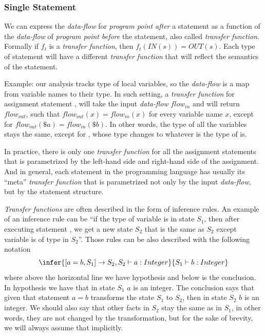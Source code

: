         \subsubsection*{Single Statement}
        
        We can express the \emph{data-flow} for \emph{program point after} 
        a statement as a function of the \emph{data-flow} of 
        \emph{program point before} the statement, also called \emph{transfer function}. 
        Formally if $f_t$ is a \emph{transfer function}, then $f_t(IN(s))=OUT(s)$.
        Each type of statement will have a different \emph{transfer function} 
        that will reflect the semantics of the statement. 
        
        Example: our analysis tracks type of local variables, so the \emph{data-flow} 
        is a map from variable names to their type. In such setting, a \emph{transfer function} 
        for assignment statement , will take the input \emph{data-flow} 
        $flow_{in}$ and will return $flow_{out}$, such that $flow_{out}(x)=flow_{in}(x)$ for 
        every variable name $x$, except for $flow_{out}(\$a)=flow_{in}(\$b)$. In other words, 
        the type of all the variables stays the same, except for , whose type 
        changes to whatever is the type of  is. 
        
        In practice, there is only one \emph{transfer function} for all the assignment 
        statements that is parametrized by the left-hand side and right-hand side of 
        the assignment. And in general, each statement in the programming language has 
        usually its ``meta'' \emph{transfer function} that is parametrized not only 
        by the input \emph{data-flow}, but by the statement structure.
        
        \emph{Transfer functions} are often described in the form of inference rules. 
        An example of an inference rule can be 
        ``if the type of variable  is  in state $S_1$, 
        then after executing statement , we get a new state $S_2$ that 
        is the same as $S_2$ except variable  is of type  in $S_2$''. 
        Those rules can be also described with the following notation        
        $$
        \infer{[a=b, S_1] \rightarrow S_2, S_2 \vdash a : Integer}{S_1 \vdash b : Integer}
        $$        
        where above the horizontal line we have hypothesis and below is 
        the conclusion. In hypothesis we have that in state $S_1$ $a$ 
        is an integer. The conclusion says that given that statement 
        $a=b$ transforms the state $S_1$ to $S_2$, then 
        in state $S_2$ $b$ is an integer. We should also say that other 
        facts in $S_2$ stay the same as in $S_1$, in other words, they 
        are not changed by the transformation, but for the sake 
        of brevity, we will always assume that implicitly.
        
